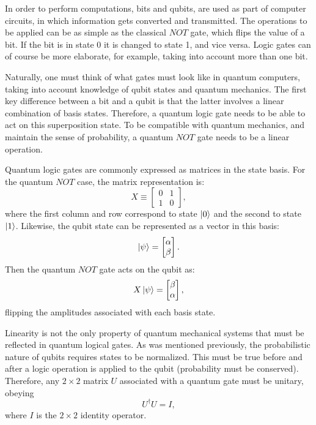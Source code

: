 In order to perform computations, bits and qubits, are used as part of computer circuits, in which information gets converted and transmitted. The operations to be applied can be as simple as the classical $NOT$ gate, which flips the value of a bit. If the bit is in state 0 it is changed to state 1, and vice versa. Logic gates can of course be more elaborate, for example, taking into account more than one bit.

Naturally, one must think of what gates must look like in quantum computers, taking into account knowledge of qubit states and quantum mechanics. The first key difference between a bit and a qubit is that the latter involves a linear combination of basis states. Therefore, a quantum logic gate needs to be able to act on this superposition state. To be compatible with quantum mechanics, and maintain the sense of probability, a quantum $NOT$ gate needs to be a linear operation.

Quantum logic gates are commonly expressed as matrices in the state basis. For the quantum $NOT$ case, the matrix representation is:
\begin{equation}
    X \equiv \begin{bmatrix}
    0&1\\
    1&0
    \end{bmatrix},
\end{equation}
where the first column and row correspond to state $\ket{0}$ and the second to state $\ket{1}$. Likewise, the qubit state can be represented as a vector in this basis:
\begin{equation}
    \ket{\psi}=\begin{bmatrix}
    \alpha\\
    \beta
    \end{bmatrix}.
\end{equation}
Then the quantum $NOT$ gate acts on the qubit as:
\begin{equation}
    X\ket{\psi} = \begin{bmatrix}
        \beta\\
        \alpha
        \end{bmatrix},
\end{equation}
flipping the amplitudes associated with each basis state.

Linearity is not the only property of quantum mechanical systems that must be reflected in quantum logical gates. As was mentioned previously, the probabilistic nature of qubits requires states to be normalized. This must be true before and after a logic operation is applied to the qubit (probability must be conserved). Therefore, any $2\times 2$ matrix $U$ associated with a quantum gate must be unitary, obeying
\begin{equation}
    U^\dagger U = I,
\end{equation}
where $I$ is the $2\times 2$ identity operator.

